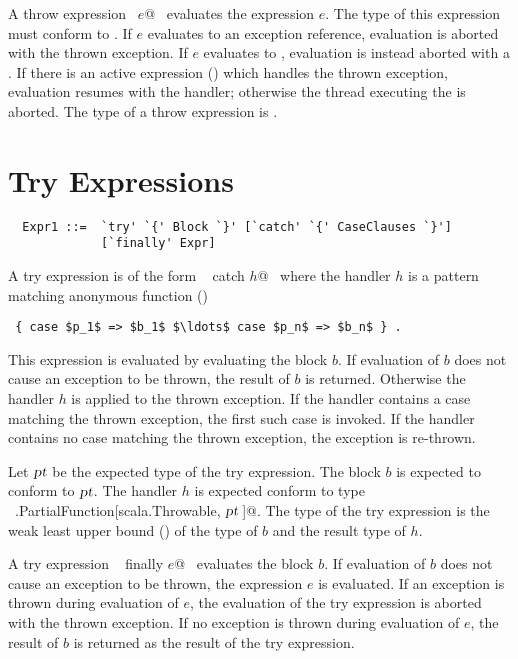A throw expression ~\lstinline@throw $e$@~ evaluates the expression
$e$. The type of this expression must conform to
.  If $e$ evaluates to an exception
reference, evaluation is aborted with the thrown exception. If $e$
evaluates to , evaluation is instead aborted with a
. If there is an active
 expression () which handles the thrown
exception, evaluation resumes with the handler; otherwise the thread
executing the  is aborted.  The type of a throw expression
is .

\section{Try Expressions}\label{sec:try}

\syntax\begin{lstlisting}
  Expr1 ::=  `try' `{' Block `}' [`catch' `{' CaseClauses `}'] 
             [`finally' Expr]
\end{lstlisting}

A try expression is of the form ~ catch $h$@~
where the handler $h$ is a pattern matching anonymous function 
()
\begin{lstlisting}
 { case $p_1$ => $b_1$ $\ldots$ case $p_n$ => $b_n$ } .
\end{lstlisting}
This expression is evaluated by evaluating the block
$b$.  If evaluation of $b$ does not cause an exception to be
thrown, the result of $b$ is returned. Otherwise the 
handler $h$ is applied to the thrown exception.  
If the handler contains a case matching the thrown exception,
the first such case is invoked. If the handler contains
no case matching the thrown exception, the exception is 
re-thrown. 

Let $\mbox{\sl pt}$ be the expected type of the try expression.  The block
$b$ is expected to conform to $\mbox{\sl pt}$.  The handler $h$
is expected conform to type
~\lstinline@scala.PartialFunction[scala.Throwable, $\mbox{\sl pt}\,$]@.  The
type of the try expression is the weak least upper bound ()
of the type of $b$
and the result type of $h$.

A try expression ~ finally $e$@~ evaluates the block
$b$.  If evaluation of $b$ does not cause an exception to be
thrown, the expression $e$ is evaluated. If an exception is thrown
during evaluation of $e$, the evaluation of the try expression is
aborted with the thrown exception. If no exception is thrown during
evaluation of $e$, the result of $b$ is returned as the
result of the try expression. 

